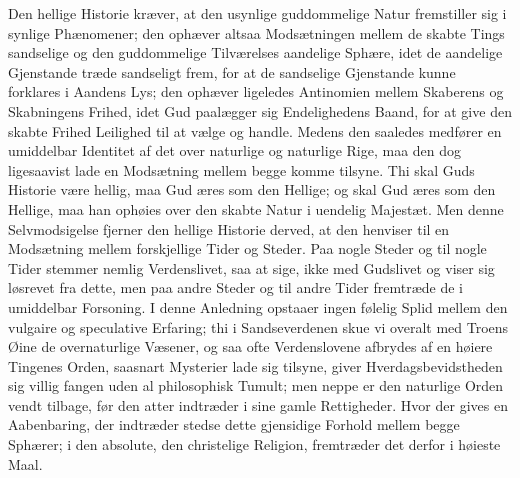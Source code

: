 \documentclass[12pt]{book}
\newcommand{\opage}[1]{\marginnote{\footnotesize\textit{[#1]}}}
\begin{document}
Den hellige Historie kræver, at den usynlige guddommelige Natur fremstiller sig i
synlige Phænomener; den ophæver altsaa Modsætningen mellem de skabte Tings
sandselige og den guddommelige Tilværelses aandelige Sphære, idet de aandelige
Gjenstande træde sandseligt frem, for at de sandselige Gjenstande kunne forklares
i Aandens Lys; den ophæver ligeledes Antinomien mellem Skaberens og Skabningens
Frihed, idet Gud paalægger sig Endelighedens Baand, for at give den skabte Frihed
Leilighed til at vælge og handle. Medens den saaledes medfører en umiddelbar
Identitet af det over\-%
\opage{54}naturlige og naturlige Rige, maa den dog ligesaavist lade en Modsætning mellem
begge komme tilsyne. Thi skal Guds Historie være hellig, maa Gud æres som den
Hellige; og skal Gud æres som den Hellige, maa han ophøies over den skabte Natur
i uendelig Majestæt. Men denne Selvmodsigelse fjerner den hellige Historie
derved, at den henviser til en Modsætning mellem forskjellige Tider og Steder.
Paa nogle Steder og til nogle Tider stemmer nemlig Verdenslivet, saa at sige,
ikke med Gudslivet og viser sig løsrevet fra dette, men paa andre Steder og til
andre Tider fremtræde de i umiddelbar Forsoning. I denne Anledning opstaaer ingen
følelig Splid mellem den vulgaire og speculative Erfaring; thi i Sandseverdenen
skue vi overalt med Troens Øine de overnaturlige Væsener, og saa ofte
Verdenslovene afbrydes af en høiere Tingenes Orden, saasnart Mysterier lade sig
tilsyne, giver Hverdagsbevidstheden sig villig fangen uden al philosophisk
Tumult; men neppe er den naturlige Orden vendt tilbage, før den atter indtræder i
sine gamle Rettigheder. Hvor der gives en Aabenbaring, der indtræder stedse dette
gjensidige Forhold mellem begge Sphærer; i den absolute, den christelige
Religion, fremtræder det derfor i høieste Maal.
\end{document}
